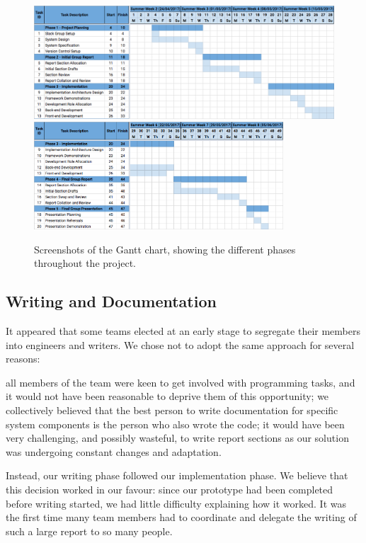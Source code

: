 \begin{figure}[h!]
	\includegraphics[width=\textwidth]{images/gantt_chart1}
	\vspace{0.1cm}\newline
	\includegraphics[width=0.83\textwidth]{images/gantt_chart2}
	\caption{Screenshots of the Gantt chart, showing the different phases throughout the project.}
	\label{fig:gantt_chart}
\end{figure}

\subsection{Writing and Documentation}
It appeared that some teams elected at an early stage to segregate their members into engineers and writers. We chose not to adopt the same approach for several reasons:

all members of the team were keen to get involved with programming tasks, and it would not have been reasonable to deprive them of this opportunity;
we collectively believed that the best person to write documentation for specific system components is the person who also wrote the code;
it would have been very challenging, and possibly wasteful, to write report sections as our solution was undergoing constant changes and adaptation.

Instead, our writing phase followed our implementation phase. We believe that this decision worked in our favour: since our prototype had been completed before writing started, we had little difficulty explaining how it worked. It was the first time many team members had to coordinate and delegate the writing of such a large report to so many people. 

